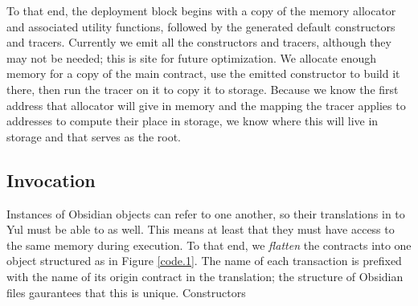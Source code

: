 To that end, the deployment block begins with a copy of the memory
allocator and associated utility functions, followed by the generated
default constructors and tracers. Currently we emit all the constructors
and tracers, although they may not be needed; this is site for future
optimization. We allocate enough memory for a copy of the main contract,
use the emitted constructor to build it there, then run the tracer on it to
copy it to storage. Because we know the first address that allocator will
give in memory and the mapping the tracer applies to addresses to compute
their place in storage, we know where this will live in storage and that
serves as the root.

\subsection{Invocation}

Instances of Obsidian objects can refer to one another, so their
translations in to Yul must be able to as well. This means at least that
they must have access to the same memory during execution. To that end, we
\emph{flatten} the contracts into one object structured as in Figure
\ref{code.1}. The name of each transaction is prefixed with the name of its
origin contract in the translation; the structure of Obsidian files
gaurantees that this is unique. Constructors
